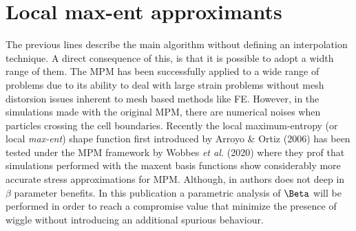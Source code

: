 \section{Local max-ent approximants}
\label{sec:local-max-ent}

The previous lines describe the main algorithm without defining an
interpolation technique. A direct consequence of this, is that it is
possible to adopt a width range of them. The MPM has been
successfully applied to a wide range of problems due to its ability to
deal with large strain problems without mesh distorsion issues inherent to
mesh based methods like FE. However, in the simulations made with the
original MPM, there are numerical noises when particles crossing
the cell boundaries. Recently the local maximum-entropy (or local
\textit{max-ent}) shape function first introduced by Arroyo \& Ortiz
(2006)\cite{Arroyo2006} has been tested under the MPM framework by
Wobbes {\it et al.} (2020)\cite{Wobbes2020} where they prof that
simulations performed with the maxent basis functions show
considerably more accurate stress approximations for MPM. Although, in
\cite{Wobbes2020} authors does not deep in $\beta$ parameter
benefits. In this publication a parametric analysis of $\Beta$ will be
performed in order to reach a compromise value that minimize the
presence of wiggle without introducing an additional spurious behaviour.

